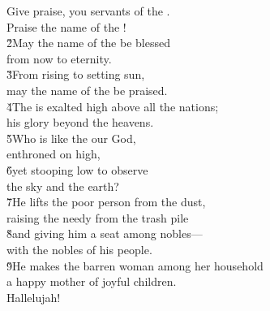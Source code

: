 \begin{poetry}
\poeml Give praise, you servants of the . \\
\poemll    Praise the name of the ! \\
\poeml \v{2}May the name of the  be blessed \\
\poemll    from now to eternity. \\
\poeml \v{3}From rising to setting sun, \\
\poemll    may the name of the  be praised. \\
\poeml \v{4}The  is exalted high above all the nations; \\
\poemll    his glory beyond the heavens. \\
\poeml \v{5}Who is like the  our God, \\
\poemll    enthroned on high, \\
\poeml \v{6}yet stooping low to observe \\
\poemll    the sky and the earth? \\
\poeml \v{7}He lifts the poor person from the dust, \\
\poemll    raising the needy from the trash pile \\
\poeml \v{8}and giving him a seat among nobles--- \\
\poemll    with the nobles of his people. \\
\poeml \v{9}He makes the barren woman among her household \\
\poemll    a happy mother of joyful children. \\
\poeml Hallelujah!
\end{poetry}


